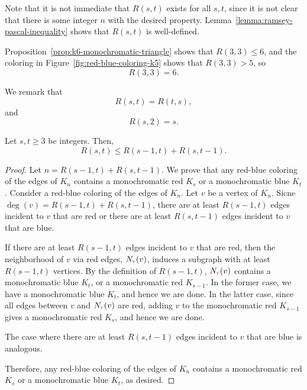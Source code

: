 Note that it is not immediate that \(R(s, t)\) exists for all \(s, t\),
since it is not clear that there is some integer \(n\) with the desired property.
Lemma~\ref{lemma:ramsey-pascal-inequality} shows that \(R(s, t)\) is well-defined.

\begin{example}
    Proposition~\ref{prop:k6-monochromatic-triangle} shows that \(R(3, 3) \leq 6\), and the coloring in Figure~\ref{fig:red-blue-coloring-k5} shows that \(R(3, 3) > 5\),
    so
    \begin{equation}
        R(3, 3) = 6.
    \end{equation}
\end{example}

We remark that 
\begin{equation}
    R(s, t) = R(t, s),
\end{equation}
and
\begin{equation}
    R(s, 2) = s.
\end{equation}

\begin{lemma} \label{lemma:ramsey-pascal-inequality}
    Let \(s, t \geq 3\) be integers.
    Then,
    \begin{equation}
        R(s, t) \leq R(s - 1, t) + R(s, t - 1).
    \end{equation}
\end{lemma}

\begin{proof}
    Let \(n = R(s - 1, t) + R(s, t - 1)\).
    We prove that any red-blue coloring of the edges of \(K_n\) contains a monochromatic red \(K_s\) or a monochromatic blue \(K_t\).
    Consider a red-blue coloring of the edges of \(K_n\).
    Let \(v\) be a vertex of \(K_n\).
    Sicne \(\deg(v) = R(s - 1, t) + R(s, t - 1)\),
    there are at least \(R(s - 1, t)\) edges incident to \(v\) that are red
    or there are at least \(R(s, t - 1)\) edges incident to \(v\) that are blue.

    If there are at least \(R(s - 1, t)\) edges incident to \(v\) that are red,
    then the neighborhood of \(v\) via red edges, \(N_{\textcolor{red}{r}}(v)\),
    induces a subgraph with at least \(R(s - 1, t)\) vertices.
    By the definition of \(R(s - 1, t)\),
    \(N_{\textcolor{red}{r}}(v)\) contains a monochromatic blue \(K_t\),
    or a monochromatic red \(K_{s - 1}\).
    In the former case, we have a monochromatic blue \(K_t\), and hence we are done.
    In the latter case, since all edges between \(v\) and \(N_{\textcolor{red}{r}}(v)\) are red,
    adding \(v\) to the monochromatic red \(K_{s - 1}\) gives a monochromatic red \(K_s\), and hence we are done.

    The case where there are at least \(R(s, t - 1)\) edges incident to \(v\) that are blue is analogous.

    Therefore, any red-blue coloring of the edges of \(K_n\) contains a monochromatic red \(K_s\) or a monochromatic blue \(K_t\), as desired.
\end{proof}

